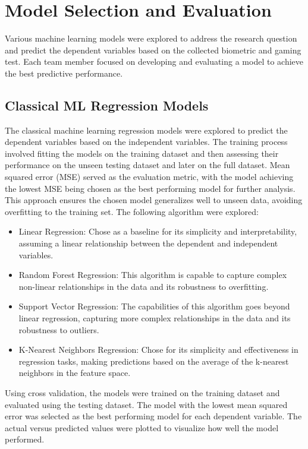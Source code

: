 \section{Model Selection and Evaluation}
Various machine learning models were explored to address the research question and predict the dependent variables based on the collected biometric and gaming test. Each team member
focused on developing and evaluating a model to achieve the best predictive performance.

\subsection{Classical ML Regression Models}
The classical machine learning regression models were explored to predict the dependent variables based on the independent variables.
The training process involved fitting the models on the training dataset and then assessing their performance on the unseen testing dataset and later on the full dataset.
Mean squared error (MSE) served as the evaluation metric,
with the model achieving the lowest MSE being chosen as the best performing model for further analysis. This approach ensures the chosen model generalizes well to unseen data, avoiding
overfitting to the training set. The following algorithm were explored:

\begin{itemize}
    \item Linear Regression: Chose as a baseline for its simplicity and interpretability, assuming a linear relationship between the dependent and independent variables. \cite{poole1971assumptions}
    \item Random Forest Regression: This algorithm is capable to capture complex non-linear relationships in the data and its robustness to overfitting. \cite{liu2012new}
    \item Support Vector Regression: The capabilities of this algorithm goes beyond linear regression, capturing more complex relationships in the data and its robustness to outliers. \cite{mangasarian2000robust}
    \item K-Nearest Neighbors Regression: Chose for its simplicity and effectiveness in regression tasks, making predictions based on the average of the k-nearest neighbors in the feature space. \cite{song2017efficient}
\end{itemize}

Using cross validation, the models were trained on the training dataset and evaluated using the testing dataset. The model with the lowest mean squared error was selected as the best performing
model for each dependent variable. The actual versus predicted values were plotted to visualize how well the model performed.

